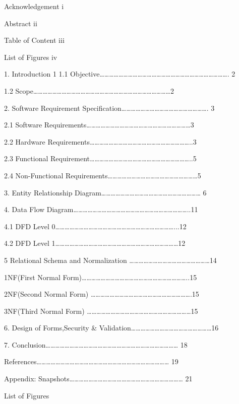	Acknowledgement									i

	Abstract                                                                                                                      ii
	
	Table of Content 									iii

	List of Figures									            iv
	
     1.	Introduction		                                                                                               1									
1.1	Objective………………………………………………………………………. 2	

1.2	Scope……………………………………………………………………………2

    2.    Software Requirement Specification………………………………………………. 3
	
	2.1 Software Requirements…………………………………………………………3
		
	2.2 Hardware Requirements………………………………………………………..3
	
	2.3 Functional Requirement………………………………………………………..5
	
	2.4 Non-Functional Requirements…………………………………………………5

   3.      Entity Relationship Diagram……………………………………………………… 6
	
   4.      Data Flow Diagram………………………………………………………………..11
   
	4.1 DFD Level 0…………………………………………………………………...12
	
	4.2 DFD Level 1……………………………………………………………………12

    5       Relational Schema and Normalization ……………………………………………14	
		
	1NF(First Normal Form)…………………………………………………………..15	
	
	2NF(Second Normal Form) ……………………………………………………….15
		
	3NF(Third Normal Form) …………………………………………………………15


  6.      Design of Forms,Security & Validation……………………………………………16
	
  7.      Conclusion………………………………………………………………………… 18	
	
           References………………………………………………………………………… 19

          Appendix: Snapshots……………………………………………………………… 21	

	
	








List of Figures

